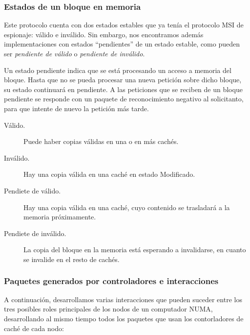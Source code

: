 \subsubsection{Estados de un bloque en memoria}
Este protocolo cuenta con dos estados estables que ya tenía el protocolo MSI de espionaje: válido e inválido. Sin embargo, nos encontramos además implementaciones con estados ``pendientes'' de un estado estable, como pueden ser \emph{pendiente de válido} o \emph{pendiente de inválido}. 

Un estado pendiente indica que se está procesando un acceso a memoria del bloque. Hasta que no se pueda procesar una nueva petición sobre dicho bloque, su estado continuará en pendiente. A las peticiones que se reciben de un bloque pendiente se responde con un paquete de reconocimiento negativo al solicitanto, para que intente de nuevo la petición más tarde.
\begin{description}
    \item [Válido.] Puede haber copias válidas en una o en más cachés.
    \item [Inválido.] Hay una copia válida en una caché en estado Modificado.
    \item [Pendiete de válido.] Hay una copia válida en una caché, cuyo contenido se trasladará a la memoria próximamente.
    \item [Pendiete de inválido.] La copia del bloque en la memoria está esperando a invalidarse, en cuanto se invalide en el resto de cachés.
\end{description}

\subsubsection{Paquetes generados por controladores e interacciones}
A continuación, desarrollamos varias interacciones que pueden suceder entre los tres posibles roles principales de los nodos de un computador NUMA, desarrollando al mismo tiempo todos los paquetes que usan los contorladores de caché de cada nodo:


